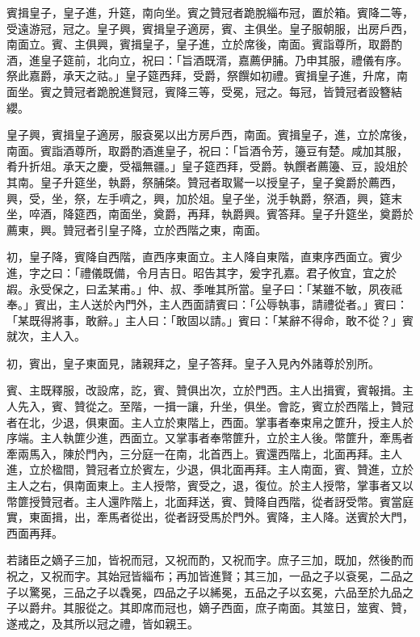 \begin{pinyinscope}
 賓揖皇子，皇子進，升筵，南向坐。賓之贊冠者跪脫緇布冠，置於箱。賓降二等，受遠游冠，冠之。皇子興，賓揖皇子適房，賓、主俱坐。皇子服朝服，出房戶西，南面立。賓、主俱興，賓揖皇子，皇子進，立於席後，南面。賓詣尊所，取爵酌酒，進皇子筵前，北向立，祝曰：「旨酒既湑，嘉薦伊脯。乃申其服，禮儀有序。祭此嘉爵，承天之祜。」皇子筵西拜，受爵，祭饌如初禮。賓揖皇子進，升席，南面坐。賓之贊冠者跪脫進賢冠，賓降三等，受冕，冠之。每冠，皆贊冠者設簪結纓。



 皇子興，賓揖皇子適房，服袞冕以出方房戶西，南面。賓揖皇子，進，立於席後，南面。賓詣酒尊所，取爵酌酒進皇子，祝曰：「旨酒令芳，籩豆有楚。咸加其服，肴升折俎。承天之慶，受福無疆。」皇子筵西拜，受爵。執饌者薦籩、豆，設俎於其南。皇子升筵坐，執爵，祭脯棨。贊冠者取鸑一以授皇子，皇子奠爵於薦西，興，受，坐，祭，左手嚌之，興，加於俎。皇子坐，涚手執爵，祭酒，興，筵末坐，啐酒，降筵西，南面坐，奠爵，再拜，執爵興。賓答拜。皇子升筵坐，奠爵於薦東，興。贊冠者引皇子降，立於西階之東，南面。



 初，皇子降，賓降自西階，直西序東面立。主人降自東階，直東序西面立。賓少進，字之曰：「禮儀既備，令月吉日。昭告其字，爰字孔嘉。君子攸宜，宜之於嘏。永受保之，曰孟某甫。」仲、叔、季唯其所當。皇子曰：「某雖不敏，夙夜祗奉。」賓出，主人送於內門外，主人西面請賓曰：「公辱執事，請禮從者。」賓曰：「某既得將事，敢辭。」主人曰：「敢固以請。」賓曰：「某辭不得命，敢不從？」賓就次，主人入。



 初，賓出，皇子東面見，諸親拜之，皇子答拜。皇子入見內外諸尊於別所。



 賓、主既釋服，改設席，訖，賓、贊俱出次，立於門西。主人出揖賓，賓報揖。主人先入，賓、贊從之。至階，一揖一讓，升坐，俱坐。會訖，賓立於西階上，贊冠者在北，少退，俱東面。主人立於東階上，西面。掌事者奉束帛之篚升，授主人於序端。主人執篚少進，西面立。又掌事者奉幣篚升，立於主人後。幣篚升，牽馬者牽兩馬入，陳於門內，三分庭一在南，北首西上。賓還西階上，北面再拜。主人進，立於楹間，贊冠者立於賓左，少退，俱北面再拜。主人南面，賓、贊進，立於主人之右，俱南面東上。主人授幣，賓受之，退，復位。於主人授幣，掌事者又以幣篚授贊冠者。主人還阼階上，北面拜送，賓、贊降自西階，從者訝受幣。賓當庭實，東面揖，出，牽馬者從出，從者訝受馬於門外。賓降，主人降。送賓於大門，西面再拜。



 若諸臣之嫡子三加，皆祝而冠，又祝而酌，又祝而字。庶子三加，既加，然後酌而祝之，又祝而字。其始冠皆緇布；再加皆進賢；其三加，一品之子以袞冕，二品之子以驚冕，三品之子以毳冕，四品之子以絺冕，五品之子以玄冕，六品至於九品之子以爵弁。其服從之。其即席而冠也，嫡子西面，庶子南面。其筮日，筮賓、贊，遂戒之，及其所以冠之禮，皆如親王。



\end{pinyinscope}